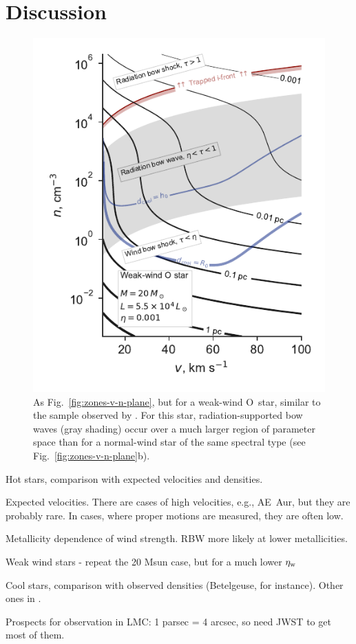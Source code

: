 \section{Discussion}
\label{sec:discussion}

\begin{figure}
  \includegraphics[width=\linewidth]{figs/zones-v-n-plane-Weak}
  \caption{As Fig.~\ref{fig:zones-v-n-plane}, but for a weak-wind
    O~star, similar to the sample observed by \citet{Martins:2005b}.
    For this star, radiation-supported bow waves (gray shading) occur
    over a much larger region of parameter space than for a
    normal-wind star of the same spectral type
    (see Fig.~\ref{fig:zones-v-n-plane}b).}
  \label{fig:O-weak-wind}
\end{figure}

Hot stars, comparison with expected velocities and densities.

Expected velocities.  There are cases of high velocities, e.g., AE~Aur, but they are probably rare. \citep{Renzo:2018a}
In cases, where proper motions are measured, they are often low.

Metallicity dependence of wind strength. RBW more likely at lower metallicities. 

Weak wind stars - repeat the 20 Msun case, but for a much lower \(\eta_{\text{w}}\)


Cool stars, comparison with observed densities (Betelgeuse, for
instance). Other ones in \citep{Cox:2012a}.

Prospects for observation in LMC: 1 parsec = 4 arcsec, so need JWST to get most of them. 

